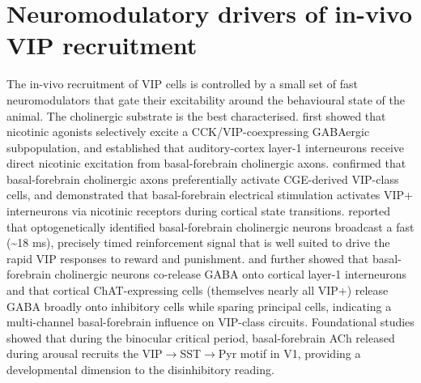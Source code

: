 \documentclass[11pt]{article}
\let\origrightarrow\rightarrow
\def\rightarrow{\ensuremath{\origrightarrow}}
\begin{document}
\section{Neuromodulatory drivers of in-vivo VIP recruitment}

The in-vivo recruitment of VIP cells is controlled by a small set of fast neuromodulators that gate their excitability around the behavioural state of the animal. The cholinergic substrate is the best characterised. \citet{Porter1999} first showed that nicotinic agonists selectively excite a CCK/VIP-coexpressing GABAergic subpopulation, and \citet{Letzkus2011} established that auditory-cortex layer-1 interneurons receive direct nicotinic excitation from basal-forebrain cholinergic axons. \citet{Arroyo2012} confirmed that basal-forebrain cholinergic axons preferentially activate CGE-derived VIP-class cells, and \citet{Alitto2013} demonstrated that basal-forebrain electrical stimulation activates VIP+ interneurons via nicotinic receptors during cortical state transitions. \citet{Hangya2015} reported that optogenetically identified basal-forebrain cholinergic neurons broadcast a fast ({\textasciitilde}18 ms), precisely timed reinforcement signal that is well suited to drive the rapid VIP responses to reward and punishment. \citet{Saunders2015} and \citet{Granger2020} further showed that basal-forebrain cholinergic neurons co-release GABA onto cortical layer-1 interneurons and that cortical ChAT-expressing cells (themselves nearly all VIP+) release GABA broadly onto inhibitory cells while sparing principal cells, indicating a multi-channel basal-forebrain influence on VIP-class circuits. Foundational studies \citep{Yaeger2019} showed that during the binocular critical period, basal-forebrain ACh released during arousal recruits the VIP\rightarrow SST\rightarrow Pyr motif in V1, providing a developmental dimension to the disinhibitory reading.
\end{document}
